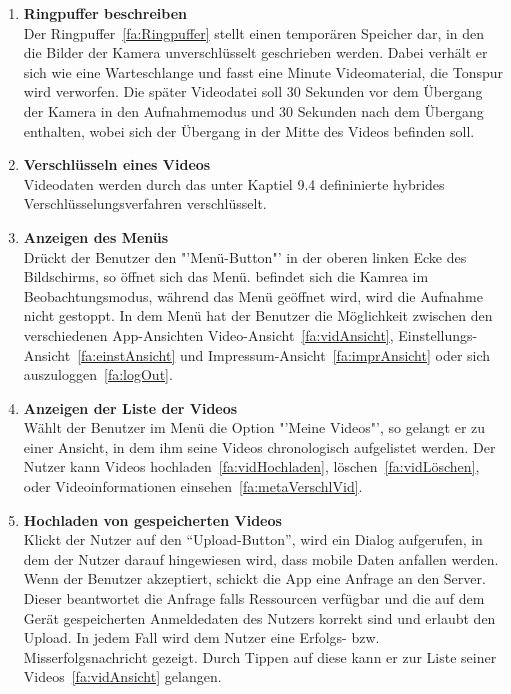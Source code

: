 \begin{enumerate}
\item \label{fa:Ringpuffer}\textbf{\gls{Ringpuffer} beschreiben} \hfill \\
Der \gls{Ringpuffer}~\eqref{fa:Ringpuffer} stellt einen temporären Speicher dar, in den die Bilder der Kamera unverschlüsselt geschrieben werden. Dabei verhält er sich wie eine Warteschlange und fasst eine Minute Videomaterial, die Tonspur wird verworfen. Die später  Videodatei soll 30 Sekunden vor dem Übergang der Kamera in den Aufnahmemodus und 30 Sekunden nach dem Übergang enthalten, wobei sich der Übergang in der Mitte des Videos befinden soll.

\item \label{fa:Verschluesselung}\textbf{Verschlüsseln eines Videos} \hfill \\
Videodaten werden durch das unter Kaptiel 9.4 defininierte hybrides Verschlüsselungsverfahren verschlüsselt.

\item \textbf{Anzeigen des Menüs} \hfill \\
Drückt der Benutzer den "'Menü-Button"' in der oberen linken Ecke des Bildschirms, so öffnet sich das Menü. befindet sich die Kamrea im Beobachtungsmodus, während das Menü geöffnet wird, wird die Aufnahme nicht gestoppt. In dem Menü hat der Benutzer die Möglichkeit zwischen den verschiedenen \gls{App}-Ansichten Video-Ansicht~\eqref{fa:vidAnsicht}, Einstellungs-Ansicht~\eqref{fa:einstAnsicht} und Impressum-Ansicht~\eqref{fa:imprAnsicht} oder sich auszuloggen~\eqref{fa:logOut}.

\item \label{fa:vidAnsicht}\textbf{Anzeigen der Liste der  Videos} \hfill \\
Wählt der Benutzer im Menü die Option "'Meine Videos"', so gelangt er zu einer Ansicht, in dem ihm seine  Videos chronologisch aufgelistet werden. Der Nutzer kann Videos hochladen~\eqref{fa:vidHochladen}, löschen~\eqref{fa:vidLöschen}, oder Videoinformationen einsehen~\eqref{fa:metaVerschlVid}.

\item \label{fa:vidHochladen}\textbf{Hochladen von gespeicherten Videos} \hfill \\
Klickt der Nutzer auf den ``Upload-Button'', wird ein Dialog aufgerufen, in dem der Nutzer darauf hingewiesen wird, dass mobile Daten anfallen werden. Wenn der Benutzer akzeptiert, schickt die \gls{App} eine Anfrage an den Server. Dieser beantwortet die Anfrage falls Ressourcen verfügbar und die auf dem Gerät gespeicherten Anmeldedaten des Nutzers korrekt sind und erlaubt den Upload. In jedem Fall wird dem Nutzer eine Erfolgs- bzw. Misserfolgsnachricht gezeigt. Durch Tippen auf diese kann er zur Liste seiner Videos~\eqref{fa:vidAnsicht} gelangen.


\end{enumerate}
